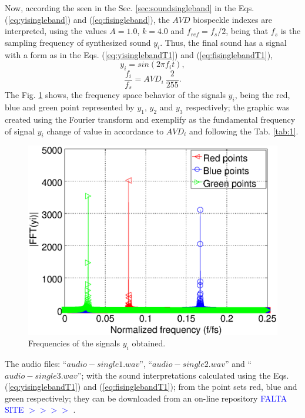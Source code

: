 \documentclass[review]{elsarticle}
\begin{document}
Now, according the seen in the Sec. \ref{sec:soundsingleband} in the 
Eqs. (\ref{eq:yisingleband}) and (\ref{eq:fisingleband}), the $AVD$ biospeckle
indexes are interpreted, using the values $A=1.0$, $k=4.0$ and $f_{ref}=f_s/2$,
being that $f_s$ is the sampling frequency of synthesized sound $y_i$. Thus,
the final sound has a signal with a form as in the Eqs. (\ref{eq:yisinglebandT1})
and (\ref{eq:fisinglebandT1}),
\begin{equation}\label{eq:yisinglebandT1}
 y_i= sin \left( 2 \pi f_i t \right),
\end{equation}
\begin{equation}\label{eq:fisinglebandT1}
 \frac{f_i}{f_s}=  AVD_i~\frac{2}{255}.
\end{equation}
The Fig. \ref{fig:image-freq-single} shows, the frequency space behavior of the
signals $y_i$, being the red, blue and green point represented by $y_1$, $y_2$ and $y_3$ 
respectively; the graphic was created using the Fourier transform and exemplify
as the fundamental frequency of signal $y_i$ change of value in accordance to $AVD_i$
and following the Tab. \ref{tab:1}.
\begin{figure}[ht!]
\centering
\includegraphics[width=0.5\columnwidth]{image-freq-single.eps}
\caption{Frequencies of the signals $y_i$ obtained.}
\label{fig:image-freq-single}
\end{figure}

The audio files: ``$audio-single1.wav$'', ``$audio-single2.wav$'' and ``$audio-single3.wav$''; 
with the sound interpretations calculated using the Eqs. (\ref{eq:yisinglebandT1}) 
and (\ref{eq:fisinglebandT1}); from the point sets red, blue and green respectively; 
they can be downloaded from an on-line repository \textcolor{blue}{FALTA SITE $>>>>$} \cite{BSLTLSINGLE}.


\end{document}
